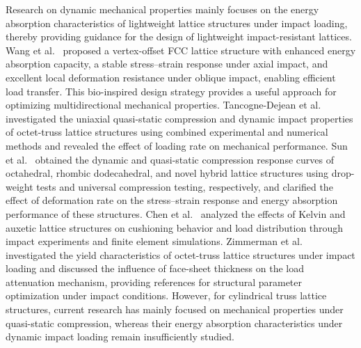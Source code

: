 \documentclass[12pt,a4paper]{article}
\begin{document}
	Research on dynamic mechanical properties mainly focuses on the energy absorption characteristics of lightweight lattice structures under impact loading, thereby providing guidance for the design of lightweight impact-resistant lattices. Wang et al.~\cite{Ref39} proposed a vertex-offset FCC lattice structure with enhanced energy absorption capacity, a stable stress--strain response under axial impact, and excellent local deformation resistance under oblique impact, enabling efficient load transfer. This bio-inspired design strategy provides a useful approach for optimizing multidirectional mechanical properties. Tancogne-Dejean et al.~\cite{Ref40} investigated the uniaxial quasi-static compression and dynamic impact properties of octet-truss lattice structures using combined experimental and numerical methods and revealed the effect of loading rate on mechanical performance. Sun et al.~\cite{Ref41} obtained the dynamic and quasi-static compression response curves of octahedral, rhombic dodecahedral, and novel hybrid lattice structures using drop-weight tests and universal compression testing, respectively, and clarified the effect of deformation rate on the stress--strain response and energy absorption performance of these structures. Chen et al.~\cite{Ref42} analyzed the effects of Kelvin and auxetic lattice structures on cushioning behavior and load distribution through impact experiments and finite element simulations. Zimmerman et al.~\cite{Ref43} investigated the yield characteristics of octet-truss lattice structures under impact loading and discussed the influence of face-sheet thickness on the load attenuation mechanism, providing references for structural parameter optimization under impact conditions. However, for cylindrical truss lattice structures, current research has mainly focused on mechanical properties under quasi-static compression, whereas their energy absorption characteristics under dynamic impact loading remain insufficiently studied.
	
\end{document}
